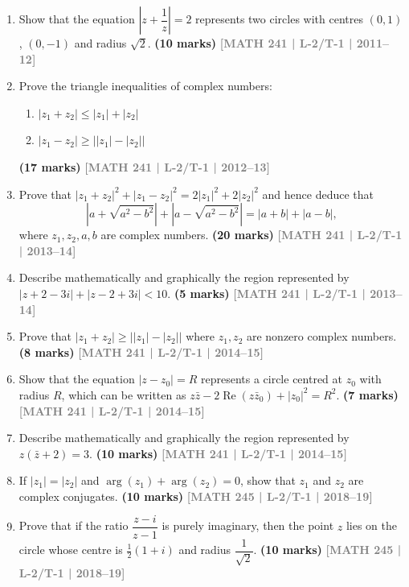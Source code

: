 \documentclass[12pt,a4paper]{article}
\newcommand{\yr}[1]{\hfill\textcolor{gray}{\small\textbf{[#1]}}}
\newcommand{\mk}[1]{\textcolor{orange!70!black}{\small\textbf{(#1 marks)}}}
\begin{document}
\begin{enumerate}

\item Show that the equation $\left|z+\dfrac{1}{z}\right|=2$ represents two circles with centres $(0,1)$, $(0,-1)$ and radius $\sqrt{2}$.
\mk{10} \yr{MATH 241 | L-2/T-1 | 2011--12}

\item Prove the triangle inequalities of complex numbers:
\begin{enumerate}
  \item $|z_{1}+z_{2}| \le |z_{1}|+|z_{2}|$
  \item $|z_{1}-z_{2}| \ge \bigl||z_{1}|-|z_{2}|\bigr|$
\end{enumerate}
\mk{17} \yr{MATH 241 | L-2/T-1 | 2012--13}

\item Prove that $|z_{1}+z_{2}|^{2}+|z_{1}-z_{2}|^{2}=2|z_{1}|^{2}+2|z_{2}|^{2}$ and hence deduce that
\[
\left|a+\sqrt{a^{2}-b^{2}}\right|+\left|a-\sqrt{a^{2}-b^{2}}\right|=|a+b|+|a-b|,
\]
where $z_{1},z_{2},a,b$ are complex numbers.
\mk{20} \yr{MATH 241 | L-2/T-1 | 2013--14}

\item Describe mathematically and graphically the region represented by $|z+2-3i|+|z-2+3i|<10$.
\mk{5} \yr{MATH 241 | L-2/T-1 | 2013--14}

\item Prove that $|z_{1}+z_{2}| \ge \bigl||z_{1}|-|z_{2}|\bigr|$ where $z_{1},z_{2}$ are nonzero complex numbers.
\mk{8} \yr{MATH 241 | L-2/T-1 | 2014--15}

\item Show that the equation $|z-z_{0}|=R$ represents a circle centred at $z_{0}$ with radius $R$, which can be written as $z\bar{z}-2\operatorname{Re}(z\bar{z}_{0})+|z_{0}|^{2}=R^{2}$.
\mk{7} \yr{MATH 241 | L-2/T-1 | 2014--15}

\item Describe mathematically and graphically the region represented by $z(\bar{z}+2)=3$.
\mk{10} \yr{MATH 241 | L-2/T-1 | 2014--15}

\item If $|z_{1}|=|z_{2}|$ and $\arg(z_{1})+\arg(z_{2})=0$, show that $z_{1}$ and $z_{2}$ are complex conjugates.
\mk{10} \yr{MATH 245 | L-2/T-1 | 2018--19}

\item Prove that if the ratio $\dfrac{z-i}{z-1}$ is purely imaginary, then the point $z$ lies on the circle whose centre is $\tfrac{1}{2}(1+i)$ and radius $\dfrac{1}{\sqrt{2}}$.
\mk{10} \yr{MATH 245 | L-2/T-1 | 2018--19}


\end{enumerate}
\end{document}
